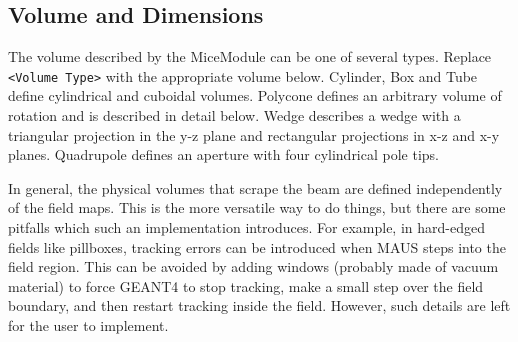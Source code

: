 \subsection{Volume and Dimensions}
The volume described by the MiceModule can be one of several types. Replace \verb|<Volume Type>| with the
appropriate volume below. Cylinder, Box and Tube define cylindrical and cuboidal volumes.
Polycone defines an arbitrary volume of rotation and is described in detail below. Wedge describes a wedge with a
triangular projection in the y-z plane and rectangular projections in x-z and x-y planes. Quadrupole defines an
aperture with four cylindrical pole tips.

In general, the physical volumes that scrape the beam are defined independently of the field maps. This is the more
versatile way to do things, but there are some pitfalls which such an implementation introduces. For example, in
hard-edged fields like pillboxes, tracking errors can be introduced when MAUS steps into the field region. This can
be avoided by adding windows (probably made of vacuum material) to force GEANT4 to stop tracking, make a small step
over the field boundary, and then restart tracking inside the field. However, such details are left for the user to
implement.


